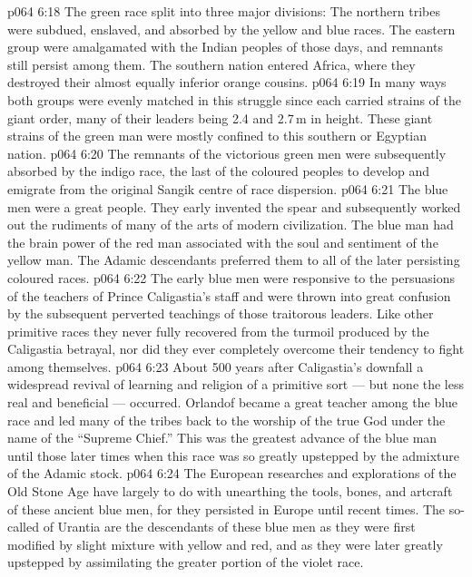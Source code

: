 \vs p064 6:18 The green race split into three major divisions: The northern tribes were subdued, enslaved, and absorbed by the yellow and blue races. The eastern group were amalgamated with the Indian peoples of those days, and remnants still persist among them. The southern nation entered Africa, where they destroyed their almost equally inferior orange cousins.
\vs p064 6:19 In many ways both groups were evenly matched in this struggle since each carried strains of the giant order, many of their leaders being 2.4 and 2.7\,m in height. These giant strains of the green man were mostly confined to this southern or Egyptian nation.
\vs p064 6:20 The remnants of the victorious green men were subsequently absorbed by the indigo race, the last of the coloured peoples to develop and emigrate from the original Sangik centre of race dispersion.
\vs p064 6:21 \bibnobreakspace {} The blue men were a great people. They early invented the spear and subsequently worked out the rudiments of many of the arts of modern civilization. The blue man had the brain power of the red man associated with the soul and sentiment of the yellow man. The Adamic descendants preferred them to all of the later persisting coloured races.
\vs p064 6:22 The early blue men were responsive to the persuasions of the teachers of Prince Caligastia’s staff and were thrown into great confusion by the subsequent perverted teachings of those traitorous leaders. Like other primitive races they never fully recovered from the turmoil produced by the Caligastia betrayal, nor did they ever completely overcome their tendency to fight among themselves.
\vs p064 6:23 About 500 years after Caligastia’s downfall a widespread revival of learning and religion of a primitive sort --- but none the less real and beneficial --- occurred. Orlandof became a great teacher among the blue race and led many of the tribes back to the worship of the true God under the name of the “Supreme Chief.” This was the greatest advance of the blue man until those later times when this race was so greatly upstepped by the admixture of the Adamic stock.
\vs p064 6:24 The European researches and explorations of the Old Stone Age have largely to do with unearthing the tools, bones, and artcraft of these ancient blue men, for they persisted in Europe until recent times. The so\hyp{}called  of Urantia are the descendants of these blue men as they were first modified by slight mixture with yellow and red, and as they were later greatly upstepped by assimilating the greater portion of the violet race.
